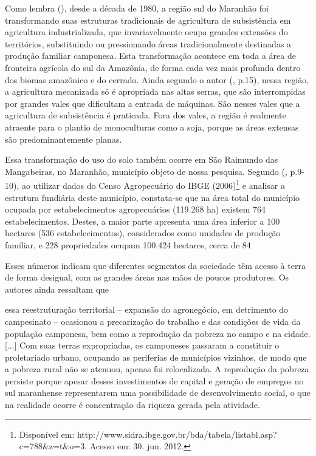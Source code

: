 Como lembra  (\citeyear{studte2008}), desde a década de 1980, a região sul do Maranhão foi transformando suas estruturas tradicionais de agricultura de subsistência em agricultura industrializada, que invariavelmente ocupa grandes extensões do territórios, substituindo ou pressionando áreas tradicionalmente destinadas a produção familiar camponesa. Esta transformação acontece em toda a área de fronteira agrícola do sul da Amazônia, de forma cada vez mais profunda dentro dos biomas amazônico e do cerrado. Ainda segundo o autor (\citeyear{studte2008}, p.15), nessa região, a agricultura mecanizada só é apropriada nas altas serras, que são interrompidas por grandes vales que dificultam a entrada de máquinas.  São nesses vales que a agricultura de subsistência é praticada. Fora dos vales, a região é realmente atraente para o plantio de monoculturas como a soja, porque as áreas extensas são predominantemente planas.

Essa transformação do uso do solo também ocorre em São Raimundo das Mangabeiras, no Maranhão, município objeto de nossa pesquisa. Segundo  (\citeyear{lima_locatel_silva}, p.9-10), ao utilizar dados do Censo Agropecuário do IBGE (2006)\footnote{Disponível em:
http://www.sidra.ibge.gov.br/bda/tabela/listabl.asp?c=788\&z=t\&o=3. Acesso em: 30. jun. 2012.} e analisar a estrutura fundiária deste município, constata-se que na área total do município ocupada por estabelecimentos agropecuários (119.268 ha) existem 764 estabelecimentos. Destes, a maior parte apresenta uma área inferior a 100 hectares (536 estabelecimentos), considerados como unidades de produção familiar, e 228 propriedades ocupam 100.424 hectares, cerca de 84%

Esses números indicam que diferentes segmentos da sociedade têm acesso à terra de forma desigual, com as grandes áreas nas mãos de poucos produtores. Os autores ainda ressaltam que

\begin{citacao}
essa reestruturação territorial – expansão do agronegócio, em detrimento do campesinato – ocasionou a precarização do trabalho e das condições de vida da população camponesa, bem como a reprodução da pobreza no campo e na cidade. [...] Com suas terras expropriadas, os camponeses passaram a constituir o proletariado urbano, ocupando as periferias de municípios vizinhos, de modo que a pobreza rural não se atenuou, apenas foi relocalizada. A reprodução da pobreza persiste porque apesar desses investimentos de capital e geração de empregos no sul maranhense representarem uma possibilidade de desenvolvimento social, o que na realidade ocorre é concentração da riqueza gerada pela atividade.
\cite[p. 12-16]{lima_locatel_silva}
\end{citacao}


